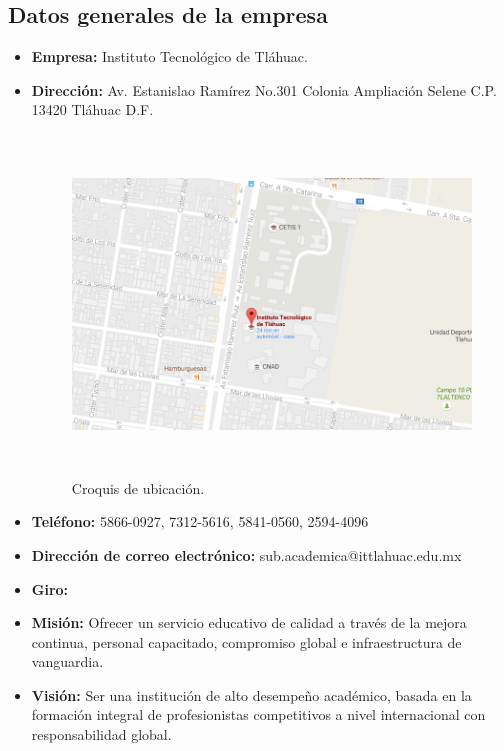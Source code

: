 \subsection{Datos generales de la empresa}
\begin{itemize}
    \item \textbf{Empresa:} Instituto Tecnol\'ogico de Tl\'ahuac.
    \item \textbf{Direcci\'on:} Av. Estanislao Ram\'irez No.301 Colonia Ampliaci\'on Selene C.P. 13420 Tl\'ahuac D.F.
    \begin{figure}[htb]
        \centering
        \includegraphics[width=14cm, height=9cm]{figuras/croquis}
        \caption{Croquis de ubicaci\'on.}
        \label{fig_croquis}
    \end{figure}
    \item \textbf{Tel\'efono:} 5866-0927, 7312-5616, 5841-0560, 2594-4096
    \item \textbf{Direcci\'on de correo electr\'onico:} sub.academica@ittlahuac.edu.mx
    \item \textbf{Giro:} 
    \item \textbf{Misi\'on:} Ofrecer un servicio educativo de calidad a trav\'es de la mejora continua, personal capacitado, compromiso global e infraestructura de vanguardia.

    \item \textbf{Visi\'on:} Ser una instituci\'on de alto desempe\~no acad\'emico, basada en la formaci\'on integral de profesionistas competitivos a nivel internacional con responsabilidad global.


\end{itemize}
